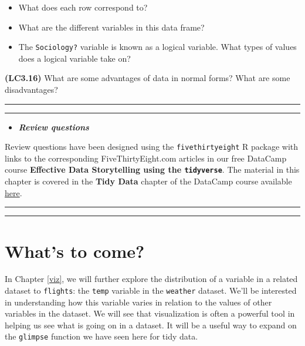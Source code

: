 \documentclass[]{tufte-book}
\let\oldrule=\rule
\renewcommand{\rule}[1]{\oldrule{\linewidth}}
\providecommand{\tightlist}{%
  \setlength{\itemsep}{0pt}\setlength{\parskip}{0pt}}
\newenvironment{rmdblock}[1]
  {\begin{shaded*}
  \begin{itemize}
  \renewcommand{\labelitemi}{
    \raisebox{-.7\height}[0pt][0pt]{
    }
  }
  \item
  }
  {
  \end{itemize}
  \end{shaded*}
  }
\newenvironment{review}
  {\begin{rmdblock}{warning}}
  {\end{rmdblock}}
\begin{document}
\begin{itemize}
\tightlist
\item
  What does each row correspond to?\\
\item
  What are the different variables in this data frame?\\
\item
  The \texttt{Sociology?} variable is known as a logical variable. What
  types of values does a logical variable take on?
\end{itemize}

\textbf{(LC3.16)} What are some advantages of data in normal forms? What
are some disadvantages?

\begin{center}\rule{0.5\linewidth}{\linethickness}\end{center}

\begin{center}\rule{0.5\linewidth}{\linethickness}\end{center}

\begin{review}
\textbf{\emph{Review questions}}
\end{review}

Review questions have been designed using the \texttt{fivethirtyeight} R
package \citep{R-fivethirtyeight} with links to the corresponding
FiveThirtyEight.com articles in our free DataCamp course
\textbf{Effective Data Storytelling using the \texttt{tidyverse}}. The
material in this chapter is covered in the \textbf{Tidy Data} chapter of
the DataCamp course available
\href{https://campus.datacamp.com/courses/effective-data-storytelling-using-the-tidyverse/tidy-data}{here}.

\begin{center}\rule{0.5\linewidth}{\linethickness}\end{center}

\begin{center}\rule{0.5\linewidth}{\linethickness}\end{center}

\section{What's to come?}\label{whats-to-come}

In Chapter \ref{viz}, we will further explore the distribution of a
variable in a related dataset to \texttt{flights}: the \texttt{temp}
variable in the \texttt{weather} dataset. We'll be interested in
understanding how this variable varies in relation to the values of
other variables in the dataset. We will see that visualization is often
a powerful tool in helping us see what is going on in a dataset. It will
be a useful way to expand on the \texttt{glimpse} function we have seen
here for tidy data.
\end{document}

